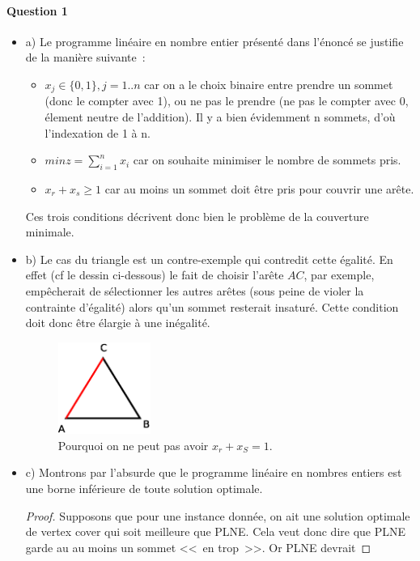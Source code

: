 \paragraph{Question 1}

\begin{itemize}
\item[] a) Le programme linéaire en nombre entier présenté dans
  l'énoncé se justifie de la manière suivante~:
\begin{itemize}
\item $x_j \in \{0,1\}, j=1..n$ car on a le choix binaire entre prendre un
  sommet (donc le compter avec 1), ou ne pas le prendre (ne pas le
  compter avec 0, élement neutre de l'addition). Il y a bien
  évidemment n sommets, d'où l'indexation de 1 à n.
\item $min z = \sum^n _{i=1} x_i$ car on souhaite minimiser le nombre
  de sommets pris.
\item $x_r + x_s \geq 1$ car au moins un sommet doit être pris pour
  couvrir une arête.
\end{itemize}
Ces trois conditions décrivent donc bien le problème de la couverture minimale.
\item[] b) Le cas du triangle est un contre-exemple qui contredit cette
égalité. En effet (cf le dessin ci-dessous) le fait de
choisir l'arête $AC$, par exemple, empêcherait de sélectionner les
autres arêtes (sous peine de violer la contrainte d'égalité) alors
qu'un sommet resterait insaturé. Cette condition doit donc être
élargie à une inégalité.
\begin{figure}[!ht]
\begin{center}
\includegraphics[height=3cm]{triangle.eps}
\end{center}
\caption{Pourquoi on ne peut pas avoir $x_r + x_S = 1$.}
\end{figure}
\item[] c) Montrons par l'absurde que le programme linéaire en nombres
  entiers est une borne inférieure de toute solution optimale.
\begin{proof}
Supposons que pour une instance donnée, on ait une solution optimale
de vertex cover qui soit meilleure que PLNE. Cela veut donc dire que
PLNE garde au au moins un sommet <<~en trop~>>. Or PLNE devrait

\end{proof}
\end{itemize}
